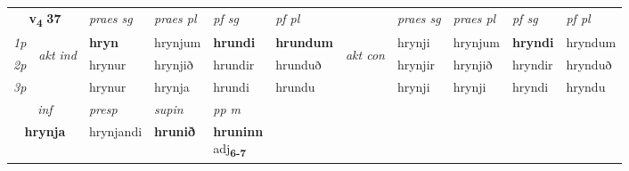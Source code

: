 \noindent
\begin{tabular}{lllllllllll} \toprule
\multicolumn{2}{c}{\textbf{v{\textsubscript{4}}} \Large{\textbf{37}}}  &  \textit{praes sg}  & \textit{praes pl}  &\textit{ pf sg} & \textit{pf pl} &  &  \textit{praes sg}  & \textit{praes pl}  & \textit{pf sg} & \textit{pf pl } \\*
	\cmidrule{3-6} \cmidrule{8-11}
 {\textit{1p}} & \multirow{3}{*}{\begin{turn}{90}\textit{akt ind}\end{turn}} & \textbf{hryn} & hrynjum & \textbf{hrundi} & \textbf{hrundum} & \multirow{3}{*}{\begin{turn}{90}\textit{akt con}\end{turn}} &hrynji & hrynjum & \textbf{hryndi} & hryndum\\*
 {\textit{2p}} &  &  hrynur  & hrynjið & hrundir & hrunduð & & hrynjir & hrynjið & hryndir & hrynduð \\*
{\textit{3p}} &  & hrynur & hrynja & hrundi & hrundu & & hrynji & hrynji& hryndi & hryndu \\*
\cmidrule{3-6} \cmidrule{8-11}

   \multicolumn{2}{c}{\textit{inf}}     & \textit{presp} & \textit{supin}  & \textit{pp m} \\*
  \multicolumn{2}{c}{\textbf{hrynja}}      & hrynjandi &  \textbf{hrunið}  & \specialcell{\textbf{hruninn} \\ adj\textbf{\textsubscript{6-7}}} \\*
\end{tabular}

